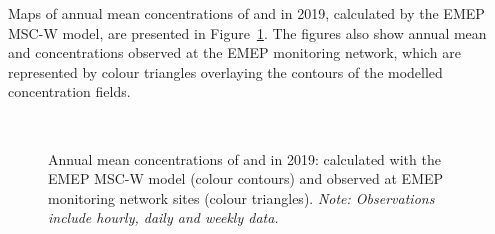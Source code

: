 Maps of annual mean concentrations of \PM[10] and \PM[2.5] in 2019,
calculated by the EMEP MSC-W model, are presented in
Figure~\ref{fig:PMin2019}. The figures also show annual mean \PM[10]
and \PM[2.5] concentrations observed at the EMEP monitoring network,
which are represented by colour triangles overlaying the contours of the
modelled concentration fields.

\begin{figure}[H]
  \\
  \vspace{0.5cm}
\caption{Annual mean concentrations of \PM[10] and \PM[2.5] in 2019:
  calculated with the EMEP MSC-W model (colour contours) and observed
  at EMEP monitoring network sites (colour triangles). \textit{Note:
    Observations include hourly, daily and weekly data.}}
\label{fig:PMin2019}
\end{figure}


